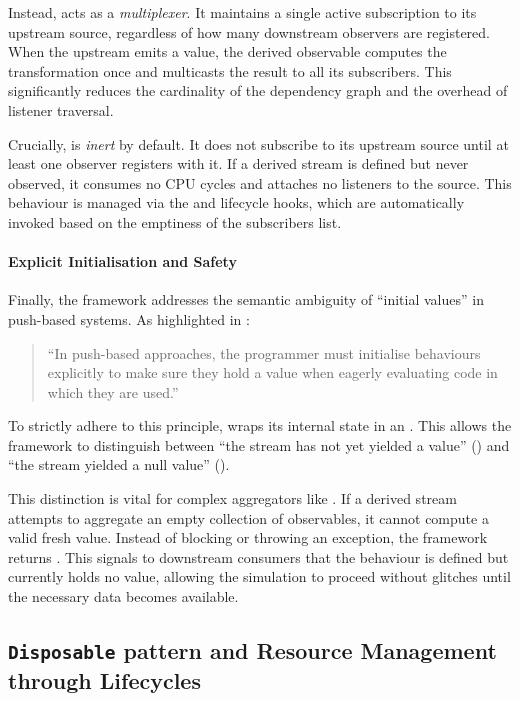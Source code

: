 Instead,  acts as a \emph{multiplexer}. It maintains
a single active subscription to its upstream source, regardless of how many
downstream observers are registered. When the upstream emits a value, the
derived observable computes the transformation once and multicasts the result
to all its subscribers. This significantly reduces the cardinality of the
dependency graph and the overhead of listener traversal.

Crucially,  is \emph{inert} by default. It does not
subscribe to its upstream source until at least one observer registers with it.
If a derived stream is defined but never observed, it consumes no CPU cycles
and attaches no listeners to the source. This behaviour is managed via the
 and  lifecycle hooks, which are
automatically invoked based on the emptiness of the subscribers list.

\paragraph{Explicit Initialisation and Safety}
Finally, the framework addresses the semantic ambiguity of ``initial values'' in
push-based systems. As highlighted in \cite{bainomugisha2013SRP}:
\begin{quote}
	``In push-based approaches, the programmer must initialise behaviours
	explicitly to make sure they hold a value when eagerly evaluating code in
	which they are used.''
\end{quote}

To strictly adhere to this principle,  wraps its
internal state in an . This allows the framework to
distinguish between ``the stream has not yet yielded a value'' () and ``the
stream yielded a null value'' ().

This distinction is vital for complex aggregators like .
If a derived stream attempts to aggregate an empty collection of observables,
it cannot compute a valid fresh value. Instead of blocking or throwing an
exception, the framework returns . This signals to downstream
consumers that the behaviour is defined but currently holds no value, allowing
the simulation to proceed without glitches until the necessary data becomes
available.

\subsection{\texttt{Disposable} pattern and Resource Management through
	Lifecycles}\label{ssec:disposability}

